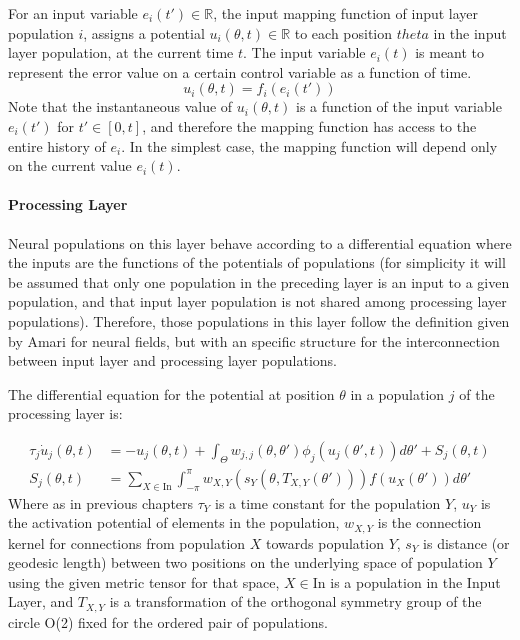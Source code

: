 
For an input variable $e_i(t') \in \mathbb{R}$, the input mapping
function of input layer population $i$, assigns a potential
$u_i(\theta,t) \in \mathbb{R}$ to each position $theta$ in the input
layer population, at the current time $t$. The input variable
$e_i(t)$ is meant to represent the error value on a certain control
variable as a function of time.
\begin{equation}
  \label{eq:eqn-inpos}
  u_i(\theta,t)=f_i(e_i(t'))
\end{equation}
Note that the instantaneous value of $u_i(\theta,t)$ is a function of
the input variable $e_i(t')$ for $t' \in [0,t]$, and therefore the
mapping function has access to the entire history of $e_i$. In the
simplest case, the mapping function will depend only on the current
value $e_i(t)$.

\paragraph{Processing Layer}
Neural populations on this layer behave according to a differential
equation where the inputs are the functions of the potentials of
populations (for simplicity it will be assumed that only one
population in the preceding layer is an input to a given population,
and that input layer population is not shared among processing layer
populations). Therefore, those populations in this layer follow the
definition given by Amari for neural fields, but with an specific
structure for the interconnection between input layer and processing
layer populations.

The differential equation for the potential at position $\theta$ in a
population $j$ of the processing layer is:

\begin{align}
  \label{eq:lnf-oned}
  \tau_j\dot{u}_j(\theta,t)&=-u_j(\theta,t)
    +\int_{\Theta}{w_{j,j}(\theta,\theta') 
    \phi_j \left(u_j(\theta',t) \right) d\theta'} + S_j(\theta,t) \\
  S_j(\theta,t)&=\sum_{X \in
    \mathrm{In}}\int_{-\pi}^{\pi}{w_{X,Y}\left(s_Y(\theta,T_{X,Y}(\theta'))
    \right) f\left(u_X(\theta') \right) d\theta'}
\end{align}
Where as in previous chapters $\tau_Y$ is a time constant for the
population $Y$, $u_Y$ is the activation potential of elements in the
population, $w_{X,Y}$ is the connection kernel for connections from
population $X$ towards population $Y$, $s_Y$ is distance (or geodesic
length) between two positions on the underlying space of population
$Y$ using the given metric tensor for that space, $X \in $In is a
population in the Input Layer, and $T_{X,Y}$ is a transformation of
the orthogonal symmetry group of the circle O(2) fixed for the ordered
pair of populations.

